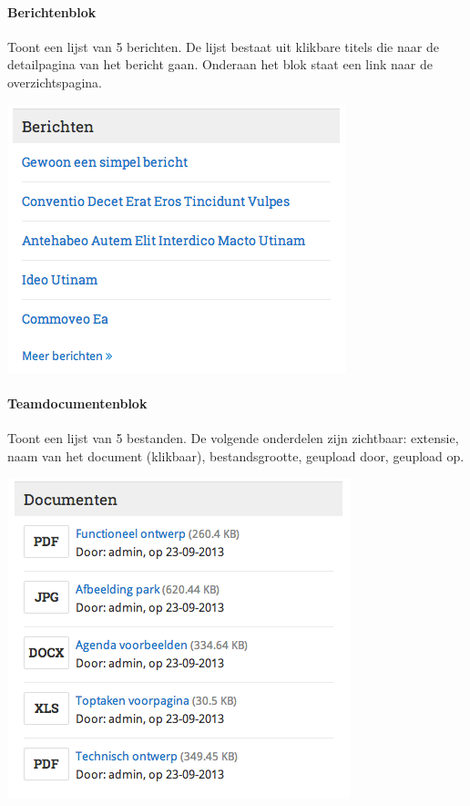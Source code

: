 \paragraph{Berichtenblok}

Toont een lijst van 5 berichten. De lijst bestaat uit klikbare titels die naar de detailpagina van het bericht gaan. Onderaan het blok staat een link naar de overzichtspagina.

\begin{center}
	\includegraphics[scale=0.5]{img/blokken/berichten.png}
\end{center}

\paragraph{Teamdocumentenblok}

Toont een lijst van 5 bestanden. De volgende onderdelen zijn zichtbaar: extensie, naam van het document (klikbaar), bestandsgrootte, geupload door, geupload op.

\begin{center}
	\includegraphics[scale=0.5]{img/blokken/teamdocumenten.png}
\end{center}

